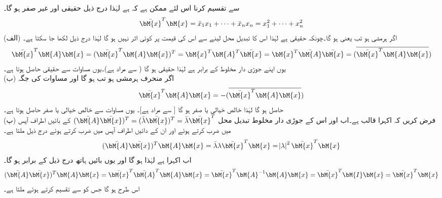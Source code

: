  سے تقسیم کرنا اس لئے ممکن ہے کہ  ہے لہٰذا درج ذیل حقیقی اور غیر صفر ہو گا۔
\begin{align*}
\bar{\bM{x}}^T\bM{x}=\bar{x}_1x_1+\cdots+\bar{x}_nx_n=x_1^2+\cdots+x_n^2
\end{align*}
(الف) اگر  ہرمشی ہو تب  یعنی  ہو گا۔چونکہ  حقیقی ہے لہٰذا اس کا تبدیل محل لینے سے اس کی قیمت پر کوئی اثر نہیں ہو گا لہٰذا درج ذیل لکھا جا سکتا ہے۔
\begin{align}\label{مساوات_امتیازی_مسئلہ_اقدار_ب}
\bar{\bM{x}}^T\bM{A}\bM{x}=(\bar{\bM{x}}^T\bM{A}\bM{x})^T=\bM{x}^T\bM{A}^T\bar{\bM{x}}=\bM{x}^T\bar{\bM{A}}\bar{\bM{x}}=(\overline{\bar{\bM{x}}^T\bM{A}\bM{x}})
\end{align} 
یوں  اپنے جوڑی دار مخلوط کے برابر ہے لہٰذا  حقیقی ہو گا ( سے مراد  ہے)۔یوں مساوات  سے  حقیقی حاصل ہوتا ہے۔\\
(ب) اگر  منحرف ہرمشی ہو تب  ہو گا اور مساوات  کی جگہ
\begin{align}\label{مساوات_امتیازی_مسئلہ_اقدار_پ}
\bar{\bM{x}}^T\bM{A}\bM{x}=-(\overline{\bar{\bM{x}}^T\bM{A}\bM{x}})
\end{align}
حاصل ہو گا لہٰذا  خالص خیالی یا صفر  ہو گا [ سے مراد  ہے]۔ یوں مساوات  سے  خالص خیالی یا صفر  حاصل ہوتا ہے۔\\
(پ) فرض کریں کہ  اکہرا  قالب ہے۔اب  اور اس کے جوڑی دار مخلوط تبدیل محل 
$(\bar{\bM{A}}\bar{\bM{x}})^T=(\bar{\lambda}\bar{\bM{x}})^T=\bar{\lambda}\bar{\bM{x}}^T$
کے بائیں اطراف آپس میں ضرب کرتے ہوئے اور ان کے دائیں اطراف آپس میں ضرب کرتے ہوئے درج ذیل ملتا ہے۔
\begin{align*}
(\bar{\bM{A}}\bar{\bM{x}})^T\bM{A}\bM{x}=\bar{\lambda}\lambda\bar{\bM{x}}^T\bM{x}=\abs{\lambda}^2\bar{\bM{x}}^T\bM{x}
\end{align*}
اب  اکہرا ہے لہٰذا  ہو گا اور یوں بائیں ہاتھ درج ذیل کے برابر ہو گا۔
\begin{align*}
(\bar{\bM{A}}\bar{\bM{x}})^T\bM{A}\bM{x}=\bar{\bM{x}}^T\bar{\bM{A}}^T\bM{A}\bM{x}=\bar{\bM{x}}^T\bM{A}^{-1}\bM{A}\bM{x}=\bar{\bM{x}}^T\bM{I}\bM{x}=\bar{\bM{x}}^T\bM{x}
\end{align*}
اس طرح  ہو گا جس کو  سے تقسیم کرتے ہوئے  ملتا ہے۔

